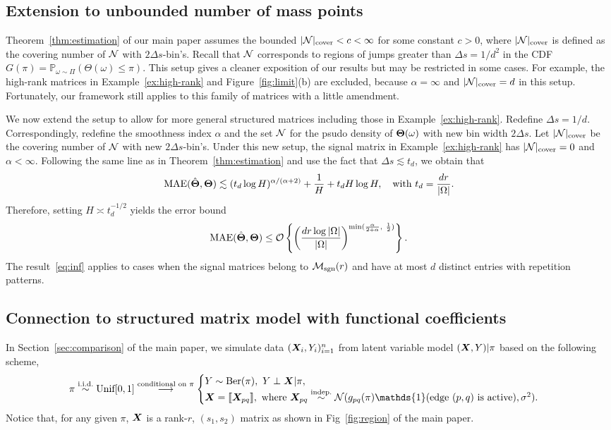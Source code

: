 \documentclass[11pt]{article}
\theoremstyle{plain}
\theoremstyle{definition}
\def\caliM{\tM_{\textup{sgn}}}
\def\caliM{\tM_{\textup{sgn}}}
\begin{document}
\subsection{Extension to unbounded number of mass points}\label{sec:unbounded}
Theorem~\ref{thm:estimation} of our main paper assumes the bounded $|\mathcal{N}|_{\text{cover}}<c<\infty$ for some constant $c>0$, where $|\mathcal{N}|_{\text{cover}}$ is defined as the covering number of $\mathcal{N}$ with $2\Delta s$-bin's. Recall that $\mathcal{N}$ corresponds to regions of jumps greater than $\Delta s = {1/d^2}$ in the CDF $G(\pi)=\mathbb{P}_{\omega\sim \Pi}(\Theta(\omega)\leq \pi)$. This setup gives a cleaner exposition of our results but may be restricted in some cases. For example, the high-rank matrices in Example~\ref{ex:high-rank} and Figure~\ref{fig:limit}(b) are excluded, because $\alpha=\infty$ and $|\mathcal{N}|_{\text{cover}}=d$ in this setup. Fortunately, our framework still applies to this family of matrices with a little amendment. 

We now extend the setup to allow for more general structured matrices including those in Example~\ref{ex:high-rank}. Redefine $\Delta s = {1/d}$. Correspondingly, redefine the smoothness index $\alpha$ and the set $\mathcal{N}$ for the psudo density of $\bm{\Theta}(\omega)$ with new bin width $2\Delta s$. Let $|\mathcal{N}|_{\text{cover}}$ be the covering number of $\mathcal{N}$ with new $2\Delta s$-bin's. Under this new setup, the signal matrix in Example~\ref{ex:high-rank} has $|\mathcal{N}|_{\text{cover}}=0$ and $\alpha<\infty$. Following the same line as in Theorem~\ref{thm:estimation} and use the fact that $\Delta s\lesssim t_d$, we obtain that
\[
\textup{MAE}(\hat {\bm{\Theta}}, \bm{\Theta})\lesssim (t_d \log H)^{\alpha/(\alpha+2)}+{1\over H}+t_dH\log H,\quad \text{with }t_d={d r\over |\Omega|}.
\]
Therefore, setting $H\asymp t_d^{-1/2}$ yields the error bound
\begin{equation}\label{eq:inf}
\textup{MAE}(\hat \mTheta, \mTheta)\leq \tO\left\{\left( {dr\log|\Omega|\over |\Omega|}\right)^{\min({\alpha\over 2+\alpha},\ {1\over 2})}\right\}.
\end{equation}
The result~\eqref{eq:inf} applies to cases when the signal matrices belong to $\caliM(r)$ and have at most $d$ distinct entries with repetition patterns. 


\subsection{Connection to structured matrix model with functional coefficients}\label{sec:joint}
In Section~\ref{sec:comparison} of the main paper, we simulate data $(\bm X_i,Y_i)_{i=1}^n$ from latent variable model $(\bm X,Y)|\pi$ based on the following scheme,
\[
\pi \stackrel{\text{i.i.d.}}{\sim} \text{Unif}[0,1] \stackrel{\text{conditional on $\pi$}}{\longrightarrow}
\begin{cases}
Y\sim \text{Ber}(\pi),\ Y\perp \mX|\pi, \\
\mX=\entry{\mX_{pq}}, \ \text{where\ } \mX_{pq}\stackrel{\text{indep.}}{\sim} \tN(g_{pq}(\pi)\mathds{1}(\text{edge $(p,q)$ is active}), \sigma^2).
\end{cases}
\]
Notice that, for any given $\pi$, $\bm X$ is a rank-$r$, $(s_1,s_2)$ matrix as shown in Fig~\ref{fig:region} of the main paper. 
\end{document}
